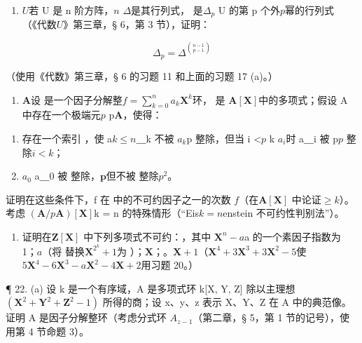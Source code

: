 \begin{enumerate}
\def\labelenumi{\arabic{enumi}.}
\setcounter{enumi}{18}
\tightlist
\item
  \(U\)若 U 是 n 阶方阵，\(n\) \(\Delta\)是其行列式， 是\(\Delta_p\) U 的第 p 个外\(p\)幂的行列式（《代数\(U\)》第三章，§ 6，第 3 节），证明：
\end{enumerate}

\[
\Delta_ {p} = \Delta^ {\binom {n - 1} {p - 1}}
\]

（使用《代数》第三章，§ 6 的习题 11 和上面的习题 17 (a)。）

\begin{enumerate}
\def\labelenumi{\arabic{enumi}.}
\setcounter{enumi}{19}
\tightlist
\item
  \(\mathbf{A}\)设  是一个因子分解整\(f = \sum_{k=0}^{n} a_k \mathbf{X}^k\)环， 是  \(\mathbf{A}[\mathbf{X}]\)中的多项式；假设 A 中存在一个极端元\(p\) p\(\mathbf{A}\)，使得：
\end{enumerate}

\begin{enumerate}
\def\labelenumi{(\arabic{enumi})}
\item
  存在一个索引 ，使 a\(k \leqslant n\)＿k 不被 \(a_{k}\)p 整除，但当 i <\(p\) k \(a_{i}\)时 a＿i 被 p\(p\) 整除\(i < k\)；
\item
 \(a_0\) a＿0 被  整除，\(\pmb{p}\)但不被  整除\(p^2\)。
\end{enumerate}

证明在这些条件下，f 在  中的不可约因子之一的次数 \(f\)（在\(\mathbf{A}[\mathbf{X}]\)  中论证\(\geqslant k\)）。考虑 \((\mathbf{A} / p\mathbf{A})[\mathbf{X}]\)k = n 的特殊情形（“Eis\(k = n\)enstein 不可约性判别法”）。

\begin{enumerate}
\def\labelenumi{\arabic{enumi}.}
\setcounter{enumi}{20}
\tightlist
\item
  证明在\(\mathbf{Z}[\mathbf{X}]\)  中下列多项式不可约：，其中 \(\mathbf{X}^n - a\)a 的一个素因子指数为 1；\(a\)（将  替换\(\mathbf{X}^{2^k} + 1\)为 ）；\(\mathbf{X}\)；。\(\mathbf{X} + 1\)（\(\mathbf{X}^4 + 3\mathbf{X}^3 + 3\mathbf{X}^2 - 5\)使\(5\mathbf{X}^4 - 6\mathbf{X}^3 - a\mathbf{X}^2 - 4\mathbf{X} + 2\)用习题 20。）
\end{enumerate}

¶ 22. (a) 设 k 是一个有序域，A 是多项式环 k{[}X, Y, Z{]} 除以主理想 \((\mathbf{X}^{2} + \mathbf{Y}^{2} + \mathbf{Z}^{2} - 1)\) 所得的商；设 x、y、z 表示 X、Y、Z 在 A 中的典范像。证明 A 是因子分解整环（考虑分式环 \(A_{z-1}\)（第二章，§ 5，第 1 节的记号），使用第 4 节命题 3）。

